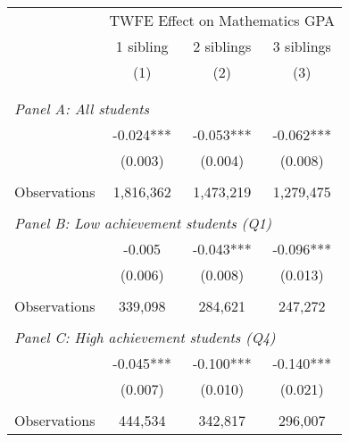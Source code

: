 \makeatletter
{}
{
\makeatother
\begin{tabular}{lccc}
\toprule
\cmidrule(lr){2-4}
& \multicolumn{3}{c}{TWFE Effect on Mathematics GPA} \\
\cmidrule(lr){2-4}
& 1 sibling & 2 siblings & 3 siblings  \\
\cmidrule(lr){2-2} \cmidrule(lr){3-3} \cmidrule(lr){4-4}
& (1) & (2) & (3)\\
\bottomrule
&  &  &  \\
&  &  &   \\
\multicolumn{4}{l}{\textit{Panel A: All students}} \\
\hspace{3mm}        &      -0.024***&      -0.053***&      -0.062***\\
                    &     (0.003)   &     (0.004)   &     (0.008)   \\
                    &               &               &               \\
\hspace{3mm}Observations&   1,816,362   &   1,473,219   &   1,279,475   \\
 
&  &  &   \\
\multicolumn{4}{l}{\textit{Panel B: Low achievement students (Q1)}} \\
\hspace{3mm}        &      -0.005   &      -0.043***&      -0.096***\\
                    &     (0.006)   &     (0.008)   &     (0.013)   \\
                    &               &               &               \\
\hspace{3mm}Observations&     339,098   &     284,621   &     247,272   \\
 
&  &  &   \\
\multicolumn{4}{l}{\textit{Panel C: High achievement students (Q4)}} \\
\hspace{3mm}        &      -0.045***&      -0.100***&      -0.140***\\
                    &     (0.007)   &     (0.010)   &     (0.021)   \\
                    &               &               &               \\
\hspace{3mm}Observations&     444,534   &     342,817   &     296,007   \\
 

\end{tabular}}
